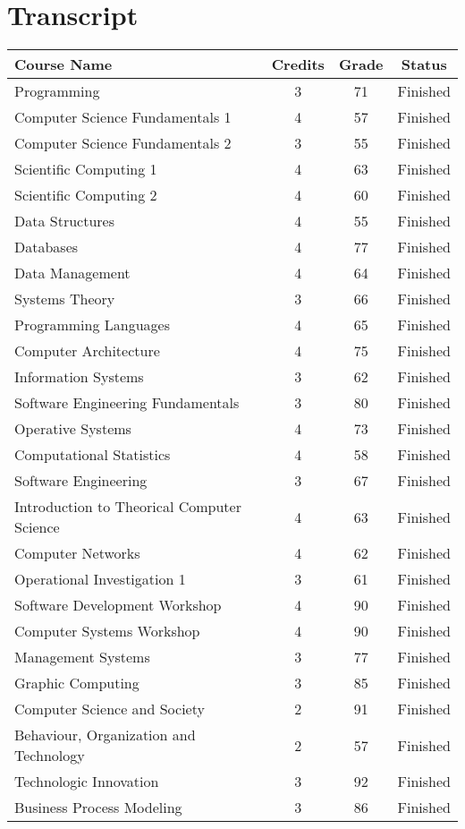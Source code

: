 \documentclass[12pt,letterpaper]{article}
\begin{document}
\section{Transcript}


\begin{center}
    \begin{tabular}{ | l | c | c | c |}
    \hline
    \bf Course Name & \bf Credits & \bf Grade & \bf Status \\ \hline
    
	\hline
	Programming & 3 & 71 & Finished \\ \hline
	Computer Science Fundamentals 1 & 4 & 57 & Finished \\ \hline
	Computer Science Fundamentals 2 & 3 & 55 & Finished \\ \hline
	Scientific Computing 1 & 4 & 63 & Finished \\ \hline
	Scientific Computing 2 & 4 & 60 & Finished \\ \hline
	Data Structures & 4 & 55 & Finished \\ \hline
	Databases & 4 & 77 & Finished \\ \hline
	Data Management & 4 & 64 & Finished \\ \hline
	Systems Theory & 3 & 66 & Finished \\ \hline
	Programming Languages & 4 & 65 & Finished \\ \hline
	Computer Architecture & 4 & 75 & Finished \\ \hline
	Information Systems & 3 & 62 & Finished \\ \hline
	Software Engineering Fundamentals & 3 & 80 & Finished \\ \hline
	Operative Systems & 4 & 73 & Finished \\ \hline
	Computational Statistics & 4 & 58 & Finished \\ \hline
	Software Engineering & 3 & 67 & Finished \\ \hline
	Introduction to Theorical Computer Science & 4 & 63 & Finished \\ \hline
	Computer Networks & 4 & 62 & Finished \\ \hline
	Operational Investigation 1 & 3 & 61 & Finished \\ \hline
	Software Development Workshop & 4 & 90 & Finished \\ \hline
	Computer Systems Workshop & 4 & 90 & Finished \\ \hline
	Management Systems & 3 & 77 & Finished \\ \hline
	Graphic Computing & 3 & 85 & Finished \\ \hline
	Computer Science and Society & 2 & 91 & Finished \\ \hline
	Behaviour, Organization and Technology & 2 & 57 & Finished \\ \hline
	Technologic Innovation & 3 & 92 & Finished \\ \hline
	Business Process Modeling & 3 & 86 & Finished \\ \hline \hline


\end{tabular}
\end{center}
\end{document}
